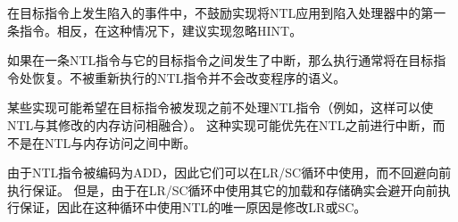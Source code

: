 在目标指令上发生陷入的事件中，不鼓励实现将NTL应用到陷入处理器中的第一条指令。相反，在这种情况下，建议实现忽略HINT。

\begin{commentary}
如果在一条NTL指令与它的目标指令之间发生了中断，那么执行通常将在目标指令处恢复。不被重新执行的NTL指令并不会改变程序的语义。

某些实现可能希望在目标指令被发现之前不处理NTL指令（例如，这样可以使NTL与其修改的内存访问相融合）。
这种实现可能优先在NTL之前进行中断，而不是在NTL与内存访问之间中断。
\end{commentary}

\begin{commentary}
由于NTL指令被编码为ADD，因此它们可以在LR/SC循环中使用，而不回避向前执行保证。
但是，由于在LR/SC循环中使用其它的加载和存储确实会避开向前执行保证，因此在这种循环中使用NTL的唯一原因是修改LR或SC。
\end{commentary}

